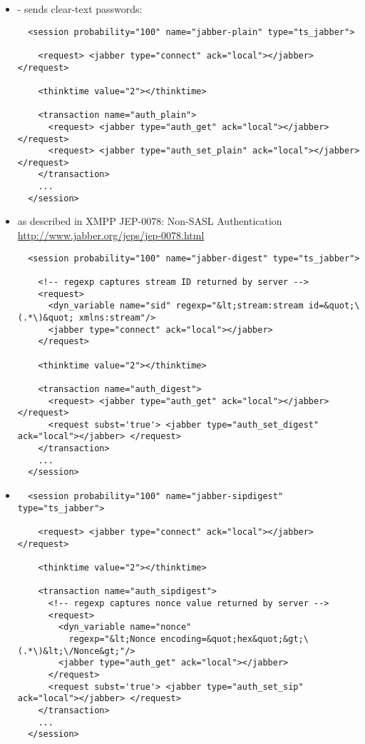 \documentclass{IDXDOC-en}
\begin{document}
\begin{itemize}
\item {} - sends clear-text passwords:
\begin{Verbatim}
  <session probability="100" name="jabber-plain" type="ts_jabber">

    <request> <jabber type="connect" ack="local"></jabber> </request>

    <thinktime value="2"></thinktime>

    <transaction name="auth_plain">
      <request> <jabber type="auth_get" ack="local"></jabber> </request>
      <request> <jabber type="auth_set_plain" ack="local"></jabber> </request>
    </transaction>
    ...
  </session>
\end{Verbatim}
\item {}  as described in XMPP JEP-0078: Non-SASL Authentication
   \url{http://www.jabber.org/jeps/jep-0078.html}
\begin{Verbatim}
  <session probability="100" name="jabber-digest" type="ts_jabber">

    <!-- regexp captures stream ID returned by server -->
    <request>
      <dyn_variable name="sid" regexp="&lt;stream:stream id=&quot;\(.*\)&quot; xmlns:stream"/>
      <jabber type="connect" ack="local"></jabber>
    </request>

    <thinktime value="2"></thinktime>

    <transaction name="auth_digest">
      <request> <jabber type="auth_get" ack="local"></jabber> </request>
      <request subst='true'> <jabber type="auth_set_digest" ack="local"></jabber> </request>
    </transaction>
    ...
  </session>
\end{Verbatim}
\item {}
\begin{Verbatim}
  <session probability="100" name="jabber-sipdigest" type="ts_jabber">

    <request> <jabber type="connect" ack="local"></jabber> </request>

    <thinktime value="2"></thinktime>

    <transaction name="auth_sipdigest">
      <!-- regexp captures nonce value returned by server -->
      <request>
        <dyn_variable name="nonce"
          regexp="&lt;Nonce encoding=&quot;hex&quot;&gt;\(.*\)&lt;\/Nonce&gt;"/>
        <jabber type="auth_get" ack="local"></jabber>
      </request>
      <request subst='true'> <jabber type="auth_set_sip" ack="local"></jabber> </request>
    </transaction>
    ...
  </session>
\end{Verbatim}
\end{itemize}
\end{document}
